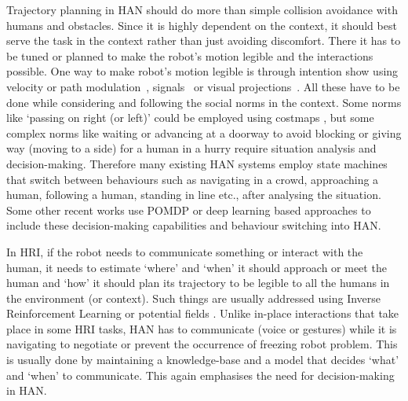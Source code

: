 Trajectory planning in HAN should do more than simple collision avoidance with humans and obstacles. Since it is highly dependent on the context, it should best serve the task in the context rather than just avoiding discomfort. There it has to be tuned or planned to make the robot's motion legible and the interactions possible. One way to make robot's motion legible is through intention show using velocity or path modulation~\cite{kruse2014evaluating, lichtenthaler2013towards}, signals~\cite{may2015show} or visual projections~\cite{shrestha2018communicating}. All these have to be done while considering and following the social norms in the context. Some norms like `passing on right (or left)' could be employed using costmaps \cite{lu2013towards}, but some complex norms like waiting or advancing at a doorway to avoid blocking or giving way (moving to a side) for a human in a hurry require situation analysis and decision-making. Therefore many existing HAN systems employ state machines that switch between behaviours such as navigating in a crowd, approaching a human, following a human, standing in line etc., after analysing the situation. Some other recent works use POMDP \cite{qian2013decision} or deep learning  \cite{banisetty2020deep} based approaches to include these decision-making capabilities and behaviour switching into HAN.



In HRI, if the robot needs to communicate something or interact with the human, it needs to estimate `where' and `when' it should approach or meet the human and `how' it should plan its trajectory to be legible to all the humans in the environment (or context). Such things are usually addressed using Inverse Reinforcement Learning \cite{ramirez_robots_2016} or potential fields \cite{hansen2009adaptive}. Unlike in-place interactions that take place in some HRI tasks, HAN has to communicate (voice or gestures) while it is navigating to negotiate or prevent the occurrence of freezing robot problem. This is usually done by maintaining a knowledge-base and a model \cite{dugas2020ian} that decides `what' and `when' to communicate. This again emphasises the need for decision-making in HAN.



